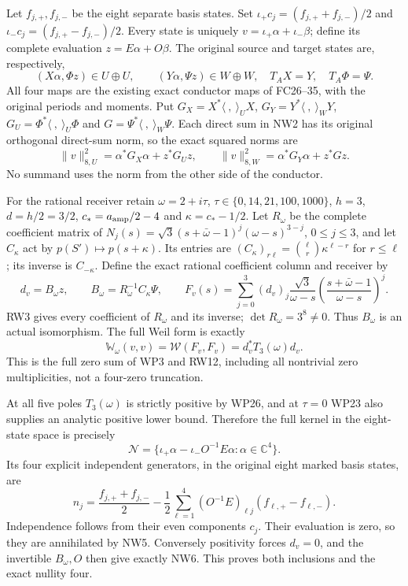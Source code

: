 \documentclass[11pt]{article}
\newcommand{\C}{\mathbb C}
\newcommand{\W}{\mathcal W}
\begin{document}
Let $f_{j,+},f_{j,-}$ be the eight separate basis states.
Set $\iota_+c_j=(f_{j,+}+f_{j,-})/2$ and
$\iota_-c_j=(f_{j,+}-f_{j,-})/2$. Every state is uniquely
$v=\iota_+\alpha+\iota_-\beta$; define its complete evaluation
$z=E\alpha+O\beta$. The original source and target states
are, respectively,
\[
 (X\alpha,\Phi z)\in U\oplus U,\qquad
 (Y\alpha,\Psi z)\in W\oplus W,
 \quad T_AX=Y,\quad T_A\Phi=\Psi.
 \tag{NW2}
\]
All four maps are the existing exact conductor maps of
FC26--35, with the original periods and moments. Put
$G_X=X^*\langle\ ,\ \rangle_U X$,
$G_Y=Y^*\langle\ ,\ \rangle_W Y$,
$G_U=\Phi^*\langle\ ,\ \rangle_U\Phi$ and
$G=\Psi^*\langle\ ,\ \rangle_W\Psi$.
Each direct sum in NW2 has its original orthogonal direct-sum
norm, so the exact squared norms are
\[
 \|v\|_{8,U}^2=\alpha^*G_X\alpha+z^*G_Uz,
 \qquad
 \|v\|_{8,W}^2=\alpha^*G_Y\alpha+z^*Gz.
 \tag{NW3}
\]
No summand uses the norm from the other side of the conductor.

For the rational receiver retain
$\omega=2+i\tau$, $\tau\in\{0,14,21,100,1000\}$,
$h=3$, $d=h/2=3/2$, $c_*=a_{\rm amp}/2-4$ and
$\kappa=c_*-1/2$. Let $R_\omega$ be the complete coefficient
matrix of
$N_j(s)=\sqrt3(s+\bar\omega-1)^j(\omega-s)^{3-j}$,
$0\le j\le3$, and let $C_\kappa$ act by
$p(S')\mapsto p(s+\kappa)$. Its entries are
$(C_\kappa)_{r\ell}=\binom\ell r\kappa^{\ell-r}$ for
$r\le\ell$; its inverse is $C_{-\kappa}$. Define the exact
rational coefficient column and receiver by
\[
 d_v=B_\omega z,\qquad B_\omega=R_\omega^{-1}C_\kappa\Psi,
 \qquad
 F_v(s)=\sum_{j=0}^3(d_v)_j\frac{\sqrt3}{\omega-s}
                     \left(\frac{s+\bar\omega-1}{\omega-s}\right)^j.
 \tag{NW4}
\]
RW3 gives every coefficient of $R_\omega$ and its inverse;
$\det R_\omega=3^8\ne0$. Thus $B_\omega$ is an actual
isomorphism. The full Weil form is exactly
\[
 \mathbb W_\omega(v,v)=\W(F_v,F_v)=d_v^*T_3(\omega)d_v.
 \tag{NW5}
\]
This is the full zero sum of WP3 and RW12, including all
nontrivial zero multiplicities, not a four-zero truncation.

At all five poles $T_3(\omega)$ is strictly positive by
WP26, and at $\tau=0$ WP23 also supplies an analytic positive
lower bound. Therefore the full kernel in the eight-state
space is precisely
\[
 \mathcal N=\{\iota_+\alpha-\iota_-O^{-1}E\alpha:
                              \alpha\in\C^4\}.
 \tag{NW6}
\]
Its four explicit independent generators, in the original
eight marked basis states, are
\[
 n_j=\frac{f_{j,+}+f_{j,-}}2
       -\frac12\sum_{\ell=1}^4(O^{-1}E)_{\ell j}
                                      (f_{\ell,+}-f_{\ell,-}).
 \tag{NW7}
\]
Independence follows from their even components $c_j$.
Their evaluation is zero, so they are annihilated by NW5.
Conversely positivity forces $d_v=0$, and the invertible
$B_\omega,O$ then give exactly NW6. This proves both
inclusions and the exact nullity four.
\end{document}
